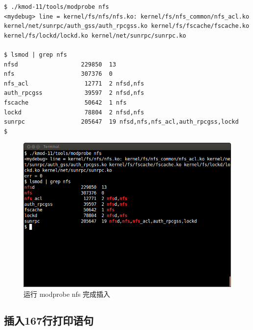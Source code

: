 {\begin{shaded}\begin{verbatim}
$ ./kmod-11/tools/modprobe nfs
<mydebug> line = kernel/fs/nfs/nfs.ko: kernel/fs/nfs_common/nfs_acl.ko kernel/net/sunrpc/auth_gss/auth_rpcgss.ko kernel/fs/fscache/fscache.ko kernel/fs/lockd/lockd.ko kernel/net/sunrpc/sunrpc.ko

$ lsmod | grep nfs
nfsd                  229850  13 
nfs                   307376  0 
nfs_acl                12771  2 nfsd,nfs
auth_rpcgss            39597  2 nfsd,nfs
fscache                50642  1 nfs
lockd                  78804  2 nfsd,nfs
sunrpc                205647  19 nfsd,nfs,nfs_acl,auth_rpcgss,lockd
$ 
\end{verbatim}\end{shaded}}
\begin{figure}[htbp]
\centering
\includegraphics{./pictures/3-3-modprobe.png}
\caption{运行 modprobe nfs 完成插入}
\end{figure}

\subsection{插入167行打印语句}

